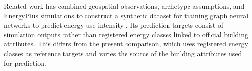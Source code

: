 Related work has combined geospatial observations, archetype assumptions, and EnergyPlus simulations to construct a synthetic dataset for training graph neural networks to predict energy use intensity \parencite{dalach2026}. Its prediction targets consist of simulation outputs rather than registered energy classes linked to official building attributes. This differs from the present comparison, which uses registered energy classes as reference targets and varies the source of the building attributes used for prediction.
